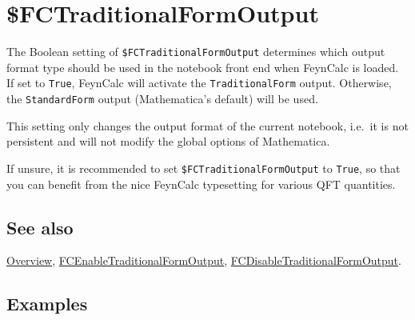 \documentclass[../FeynCalcManual.tex]{subfiles}
\begin{document}
\hypertarget{fctraditionalformoutput}{%
\section{\$FCTraditionalFormOutput}\label{fctraditionalformoutput}}

The Boolean setting of \texttt{\$FCTraditionalFormOutput} determines
which output format type should be used in the notebook front end when
FeynCalc is loaded. If set to \texttt{True}, FeynCalc will activate the
\texttt{TraditionalForm} output. Otherwise, the \texttt{StandardForm}
output (Mathematica's default) will be used.

This setting only changes the output format of the current notebook,
i.e.~it is not persistent and will not modify the global options of
Mathematica.

If unsure, it is recommended to set \texttt{\$FCTraditionalFormOutput}
to \texttt{True}, so that you can benefit from the nice FeynCalc
typesetting for various QFT quantities.

\subsection{See also}

\hyperlink{toc}{Overview},
\hyperlink{fcenabletraditionalformoutput}{FCEnableTraditionalFormOutput},
\hyperlink{fcdisabletraditionalformoutput}{FCDisableTraditionalFormOutput}.

\subsection{Examples}
\end{document}
